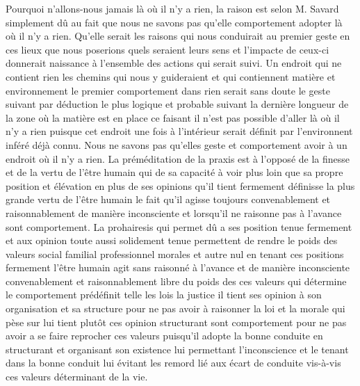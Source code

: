 \documentclass[12pt,letterpaper,oneside]{article}
\begin{document}
Pourquoi n’allons-nous jamais là où il n’y a rien, la raison est selon M. Savard simplement dû au fait que nous ne savons pas qu’elle comportement adopter là où il n’y a rien. Qu’elle serait les raisons qui nous conduirait au premier geste en ces lieux que nous poserions quels seraient leurs sens et l’impacte de ceux-ci donnerait naissance à l’ensemble des actions qui serait suivi. Un endroit qui ne contient rien les chemins qui nous y guideraient et qui contiennent matière et environnement le premier comportement dans rien serait sans doute le geste suivant par déduction le plus logique et probable suivant la dernière longueur de la zone où la matière est en place ce faisant il n’est pas possible d’aller là où il n’y a rien puisque cet endroit une fois à l’intérieur serait définit par l’environnent inféré déjà connu. Nous ne savons pas qu’elles geste et comportement avoir à un endroit où il n’y a rien. La préméditation de la praxis est à l’opposé de la finesse et de la vertu de l’être humain qui de sa capacité à voir plus loin que sa propre position et élévation en plus de ses opinions qu’il tient fermement définisse la plus grande vertu de l’être humain le fait qu’il agisse toujours convenablement et raisonnablement de manière inconsciente et lorsqu’il ne raisonne pas à l’avance sont comportement. La prohairesis qui permet dû a ses position tenue fermement et aux opinion toute aussi solidement tenue permettent de rendre le poids des valeurs social familial professionnel morales et autre nul en tenant ces positions fermement l’être humain agit sans raisonné à l’avance et de manière inconsciente convenablement et raisonnablement libre du poids des ces valeurs qui détermine le comportement prédéfinit telle les lois la justice il tient ses opinion à son organisation et sa structure pour ne pas avoir à raisonner la loi et la morale qui pèse sur lui tient plutôt ces opinion structurant sont comportement pour ne pas avoir a se faire reprocher ces valeurs puisqu’il adopte la bonne conduite en structurant et organisant son existence lui permettant l’inconscience et le tenant dans la bonne conduit lui évitant les remord lié aux écart de conduite vis-à-vis ces valeurs déterminant de la vie.
\end{document}
